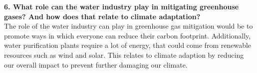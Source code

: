 \documentclass[12pt]{article}
\begin{document}
\textbf{6.  What role can the water industry play in mitigating greenhouse gases? And how does that relate to climate adaptation?} \\

The role of the water industry can play in greenhouse gas mitigation would be to promote ways in which everyone can reduce their carbon footprint. Additionally, water purification plants require a lot of energy, that could come from renewable resources such as wind and solar. This relates to climate adaption by reducing our overall impact to prevent further damaging our climate. 
\end{document}
